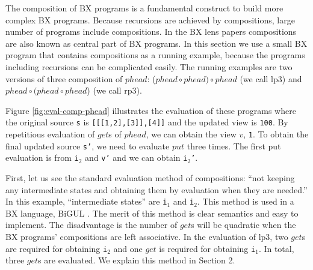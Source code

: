 The composition of BX programs is a fundamental construct to build more complex BX programs. 
Because recursions are achieved by compositions, large number of programs include compositions.
In the BX lens papers \cite{} compositions are also known as central part of BX programs.
In this section we use a small BX program that contains compositions as a running example, because the programs including recursions can be complicated easily. The running examples are two versions of three composition of $phead$: ($phead \circ phead) \circ phead$ (we call lp3) and $phead \circ (phead \circ phead$) (we call rp3).



Figure \ref{fig:eval-comp-phead} illustrates the evaluation of these programs where the original source \texttt{s} is \texttt{[[[1,2],[3]],[4]]} and the updated view is \texttt{100}.
By repetitious evaluation of $get$s of $phead$, we can obtain the view $v$, \texttt{1}. To obtain the final updated source \texttt{s'}, we need to evaluate $put$ three times. The first put evaluation is from \texttt{i$_2$} and \texttt{v'} and we can obtain \texttt{i$_2$'}.

First, let us see the standard evaluation method of compositions: ``not keeping any intermediate states and obtaining them by evaluation when they are needed.'' In this example, ``intermediate states'' are \texttt{i$_1$} and \texttt{i$_2$}. This method is used in a BX language, BiGUL \cite{Ko:2016:BFV:2847538.2847544,Ko:2017:ABB:3177123.3158129}. The merit of this method is clear semantics and easy to implement. The disadvantage is the number of $get$s will be quadratic when the BX programs' compositions are left associative. In the evaluation of lp3, two $get$s are required for obtaining \texttt{i$_2$} and one $get$ is required for obtaining \texttt{i$_1$}. In total, three $get$s are evaluated. We explain this method in Section 2.

